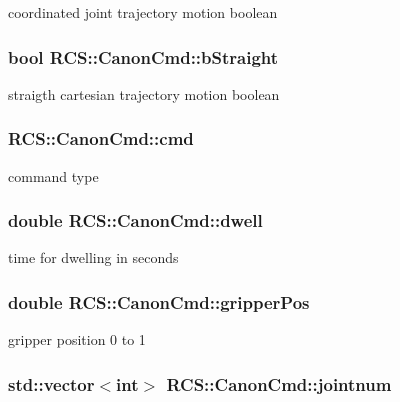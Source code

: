coordinated joint trajectory motion boolean \hypertarget{structRCS_1_1CanonCmd_aee8ba85725943aa0102f3305a1bce2a7}{
\subsubsection[{b\-Straight}]{\setlength{\rightskip}{0pt plus 5cm}bool R\-C\-S\-::\-Canon\-Cmd\-::b\-Straight}}\label{structRCS_1_1CanonCmd_aee8ba85725943aa0102f3305a1bce2a7}
straigth cartesian trajectory motion boolean \hypertarget{structRCS_1_1CanonCmd_abf4d78b8604ce73d23d58f1fdcd7305e}{
\subsubsection[{cmd}]{ R\-C\-S\-::\-Canon\-Cmd\-::cmd}}\label{structRCS_1_1CanonCmd_abf4d78b8604ce73d23d58f1fdcd7305e}
command type \hypertarget{structRCS_1_1CanonCmd_a842c88485db006b71c7653e2a2159233}{
\subsubsection[{dwell}]{\setlength{\rightskip}{0pt plus 5cm}double R\-C\-S\-::\-Canon\-Cmd\-::dwell}}\label{structRCS_1_1CanonCmd_a842c88485db006b71c7653e2a2159233}
time for dwelling in seconds \hypertarget{structRCS_1_1CanonCmd_a03e23d97c74abd3c6b5b38aec8ae5fc2}{
\subsubsection[{gripper\-Pos}]{\setlength{\rightskip}{0pt plus 5cm}double R\-C\-S\-::\-Canon\-Cmd\-::gripper\-Pos}}\label{structRCS_1_1CanonCmd_a03e23d97c74abd3c6b5b38aec8ae5fc2}
gripper position 0 to 1 \hypertarget{structRCS_1_1CanonCmd_a1fb8395cab4ebddddafd37e7387f9ff8}{
\subsubsection[{jointnum}]{\setlength{\rightskip}{0pt plus 5cm}std\-::vector$<$int$>$ R\-C\-S\-::\-Canon\-Cmd\-::jointnum}}\label{structRCS_1_1CanonCmd_a1fb8395cab4ebddddafd37e7387f9ff8}
